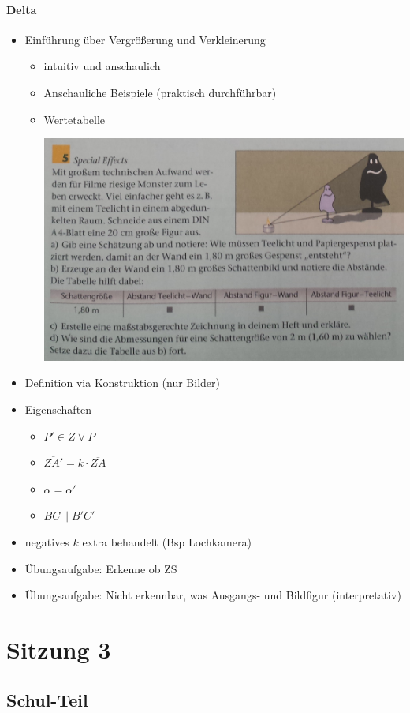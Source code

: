 \documentclass[11pt]{article}
\begin{document}
\paragraph{Delta}
\begin{itemize}
	\item Einführung über Vergrößerung und Verkleinerung
	\begin{itemize}
		\item intuitiv und anschaulich
		\item Anschauliche Beispiele (praktisch durchführbar)
		\item Wertetabelle
		\begin{center}
			\includegraphics[width=0.7\linewidth]{ZS_Bsp}
		\end{center}
	\end{itemize}
	\item Definition via Konstruktion (nur Bilder)
	\item Eigenschaften
	\begin{itemize}
		\item $ P' \in Z \lor P $
		\item $ \overline{ZA'} = k \cdot \overline{ZA} $
		\item $ \alpha = \alpha' $
		\item $ BC \parallel B'C' $
	\end{itemize}
	\item negatives $ k $ extra behandelt (Bsp Lochkamera)
	\item Übungsaufgabe: Erkenne ob ZS
	\item Übungsaufgabe: Nicht erkennbar, was Ausgangs- und Bildfigur (interpretativ)
\end{itemize}
\newpage
\section*{Sitzung 3}
\subsection*{Schul-Teil}
\end{document}
